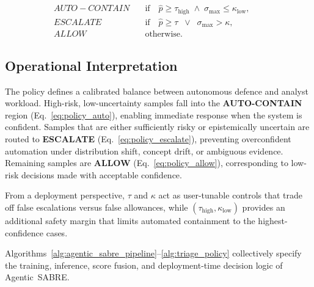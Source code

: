 \documentclass[lettersize,journal]{IEEEtran}
\begin{document}
\begin{align}
AUTO-CONTAIN \quad &\text{if} \quad   \hat{p}\ge \tau_{\text{high}}\;\wedge\;\sigma_{\max}\le \kappa_{\text{low}}, \label{eq:policy_auto} \\
ESCALATE \quad &\text{if} \quad  \hat{p}\ge \tau \;\;\vee\;\; \sigma_{\max} > \kappa, 
\label{eq:policy_escalate}  \\
ALLOW \quad &\text{otherwise}. && \label{eq:policy_allow}
\end{align}


\subsection{Operational Interpretation}
\label{subsec:policy_interpretation}

The policy defines a calibrated balance between autonomous defence and analyst workload.
High-risk, low-uncertainty samples fall into the \textbf{AUTO-CONTAIN} region
(Eq.~\ref{eq:policy_auto}), enabling immediate response when the system is confident.
Samples that are either sufficiently risky or epistemically uncertain are routed to
\textbf{ESCALATE} (Eq.~\ref{eq:policy_escalate}), preventing overconfident automation
under distribution shift, concept drift, or ambiguous evidence.
Remaining samples are \textbf{ALLOW} (Eq.~\ref{eq:policy_allow}), corresponding to
low-risk decisions made with acceptable confidence.

From a deployment perspective, $\tau$ and $\kappa$ act as user-tunable controls that
trade off false escalations versus false allowances, while
$(\tau_{\text{high}},\kappa_{\text{low}})$ provides an additional safety margin that
limits automated containment to the highest-confidence cases.


Algorithms~\ref{alg:agentic_sabre_pipeline}--\ref{alg:triage_policy}
collectively specify the training, inference, score fusion, and deployment-time
decision logic of Agentic~SABRE.
\end{document}
